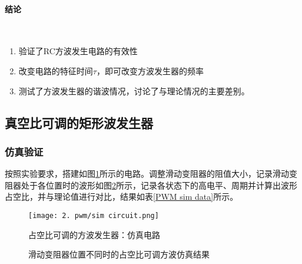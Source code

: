 \documentclass[UTF8]{ctexart}
\numberwithin{figure}{subsection}
\numberwithin{table}{subsection}
\numberwithin{equation}{subsection}
\begin{document}
\paragraph{结论}~{}
\par 
\begin{enumerate}
    \item 验证了RC方波发生电路的有效性
    \item 改变电路的特征时间\(\tau\)，即可改变方波发生器的频率
    \item 测试了方波发生器的谐波情况，讨论了与理论情况的主要差别。
\end{enumerate}

\subsection{真空比可调的矩形波发生器}
\subsubsection{仿真验证}
\par 按照实验要求，搭建如图\ref{pwm sim circuit}所示的电路。调整滑动变阻器的阻值大小，记录滑动变阻器处于各位置时的波形如图\ref{PWM sim curve}所示，记录各状态下的高电平、周期并计算出波形占空比，并与理论值进行对比，结果如表\ref{PWM sim data}所示。


\begin{figure}[H]
    \begin{center}
        \caption{占空比可调的方波发生器：仿真电路}
        \texttt{[image: 2. pwm/sim circuit.png]}
        \label{pwm sim circuit}
    \end{center}
\end{figure}




\begin{figure}[H]
    \centering
    \caption{滑动变阻器位置不同时的占空比可调方波仿真结果}
    \label{PWM sim curve}
\end{figure}
\end{document}
